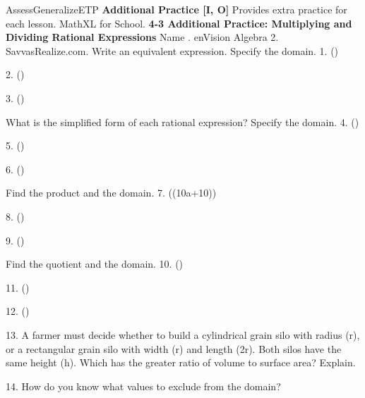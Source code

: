 \documentclass{article}
\newenvironment{te-addendum}[2]{}{}     %
\newcommand{\answer}[1]{}               %
\newcommand{\te}[1]{}                   %
\begin{document}
\begin{te-addendum}{Assess}{GeneralizeETP}
\textbf{Additional Practice [I, O]} Provides extra practice for each lesson. MathXL for School.
\textbf{4-3 Additional Practice: Multiplying and Dividing Rational Expressions}
Name \underline{\hspace{3cm}}. enVision Algebra 2. SavvasRealize.com.
Write an equivalent expression. Specify the domain.
1. ()
\answer{2; (x=-\frac32).}
\te{Printed domain uses equals; likely not equal to -3/2.}
2. ()
\answer{(\frac{3x-6}{x-3}); (x\neq-2,3).}
3. ()
\answer{(\frac{x+8}{x-7}); (x\neq-5,7).}
What is the simplified form of each rational expression? Specify the domain.
4. ()
\answer{(\frac{2x+1}{3x+2}); (x\neq-5,-\frac23).}
5. ()
\answer{(\frac{2x+3y}{x-y}); (x\neq-y,\frac23y).}
\te{Printed domain excludes -y; likely y because the denominator factors as (3x-2y)(x-y).}
6. ()
\answer{(\frac{x-3}{x-6}); (x\neq\pm6).}
Find the product and the domain.
7. (\cdot(10a+10))
\answer{(10a); (a\neq-1,0).}
\te{Printed domain unnecessarily excludes 0.}
8. (\cdot{})
\answer{1; (x\neq0,3,5).}
\te{Printed second numerator is x+3, but the printed answer 1 would require x-3 there.}
9. (\cdot{})
\answer{(\frac{7(y-4)}{6(y+5)}); (x\neq-5,-4).}
\te{Printed answer uses x in the restriction although the expressions use y; the displayed product actually simplifies to 35(y-4)/(48(y+4)).}
Find the quotient and the domain.
10. (\div{})
\answer{(\frac{x^3}{6y}); (x,y\neq0).}
11. (\div{})
\answer{(\frac y5); (y\neq0,\pm7).}
12. (\div{})
\answer{(\frac{y^2-16}{y^2-9}); (y\neq\pm1,\pm3,-4).}
13. A farmer must decide whether to build a cylindrical grain silo with radius (r), or a rectangular grain silo with width (r) and length (2r). Both silos have the same height (h). Which has the greater ratio of volume to surface area? Explain.
\answer{The cylinder, because the ratio for the cylinder is (\frac{rh}{2r+2h}) and the ratio for the rectangular prism is (\frac{rh}{2r+3h}).}
14. How do you know what values to exclude from the domain?
\answer{Answers may vary; Sample: Any value of the variable that makes the denominator equal to zero.}
\te{enVision Algebra 2 Teaching Resources.}
\end{te-addendum}
\end{document}
